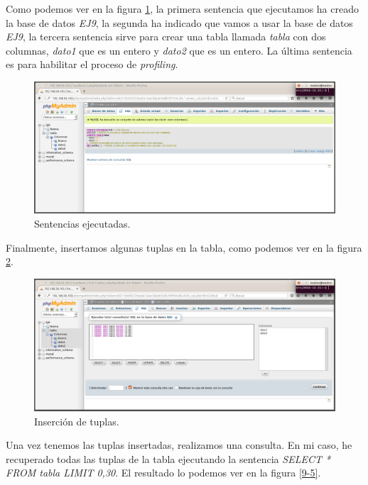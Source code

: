 \documentclass[a4paper,titlepage,12pt]{scrartcl}	%
\numberwithin{figure}{section} %
\numberwithin{table}{section} %
\begin{document}
	Como podemos ver en la figura \ref{9-3}, la primera sentencia que ejecutamos ha creado la base de datos \textit{EJ9}, la segunda ha indicado que vamos a usar la base de datos \textit{EJ9}, la tercera sentencia sirve para crear una tabla llamada \textit{tabla} con dos columnas, \textit{dato1} que es un entero y \textit{dato2} que es un entero. La última sentencia es para habilitar el proceso de \textit{profiling}.
	
	\begin{figure}[H]
		\includegraphics[width=\linewidth]{./Imagenes/9-3.png}
		\vspace{-0.5cm}
		\caption[Sentencias ejecutadas.]{Sentencias ejecutadas.}
		\label{9-3}
	\end{figure}
	
	Finalmente, insertamos algunas tuplas en la tabla, como podemos ver en la figura \ref{9-4}.
	
	\begin{figure}[H]
		\includegraphics[width=\linewidth]{./Imagenes/9-4.png}
		\vspace{-0.5cm}
		\caption[Inserción de tuplas.]{Inserción de tuplas.}
		\label{9-4}
	\end{figure}
	
	Una vez tenemos las tuplas insertadas, realizamos una consulta. En mi caso, he recuperado todas las tuplas de la tabla ejecutando la sentencia \textit{SELECT * FROM tabla LIMIT 0,30}. El resultado lo podemos ver en la figura \ref{9-5}.
	
\end{document}
